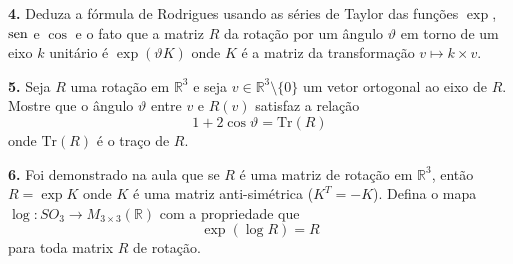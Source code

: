 \documentclass{amsart}
\newcommand{\R}{\mathbb R}
\DeclareMathOperator{\sen}{\textrm{\rm sen}}
\begin{document}
\medskip


{\bf 4.} Deduza a fórmula de Rodrigues usando as séries de Taylor das funções $\exp$, $\sen$ e $\cos$ e o fato 
que a matriz $R$ da rotação por um ângulo $\vartheta$ em torno de um eixo $k$ unitário é $\exp(\vartheta K)$ 
onde $K$ é a matriz da transformação $v\mapsto k\times v$.  


\medskip

{\bf 5.} Seja $R$ uma rotação em $\R^3$ e seja $v\in\R^3\setminus\{0\}$ um vetor ortogonal ao eixo de $R$. 
Mostre que o ângulo $\vartheta$ entre $v$ e $R(v)$ satisfaz a relação 
\[
    1+2\cos\vartheta=\mbox{Tr}(R)
\] 
onde $\mbox{Tr}(R)$ é o traço de $R$. 

\medskip

{\bf 6.} Foi demonstrado na aula que se $R$ é uma matriz de rotação em $\R^3$, então $R=\exp K$ onde 
$K$ é uma matriz anti-simétrica ($K^T=-K$). Defina o mapa $\log:SO_3\to M_{3\times 3}(\R)$ com a propriedade 
que 
\[
    \exp(\log R)=R
\] 
para toda matrix $R$ de rotação. 
\end{document}
